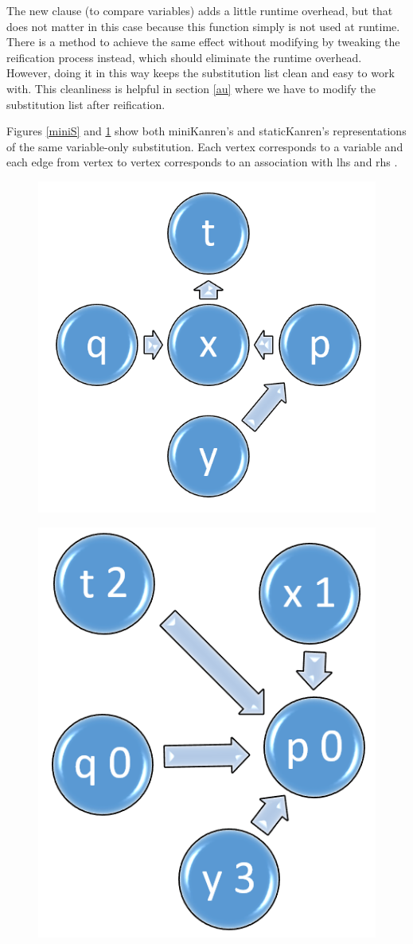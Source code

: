 The new clause (to compare variables) adds a little runtime overhead, but that does not matter in this case because this function simply is not used at runtime. There is a method to achieve the same effect without modifying  by tweaking the reification process instead, which should eliminate the runtime overhead. However, doing it in this way keeps the substitution list clean and easy to work with. This cleanliness is helpful in section \ref{au} where we have to modify the substitution list after reification.

Figures \ref{miniS} and \ref{staticS} show both miniKanren's and staticKanren's representations of the same variable-only substitution. Each vertex corresponds to a variable and each edge from vertex  to vertex  corresponds to an association with lhs  and rhs .

\begin{figure}[h]
    \centering
    \begin{minipage}{.5\textwidth}
        \includegraphics[height=.5\textwidth]{figures/miniS.png}
        \label{miniS}
    \end{minipage}%
    \begin{minipage}{.5\textwidth}
        \includegraphics[height=.5\textwidth]{figures/staticS.png}
        \label{staticS}
    \end{minipage}
\end{figure}

